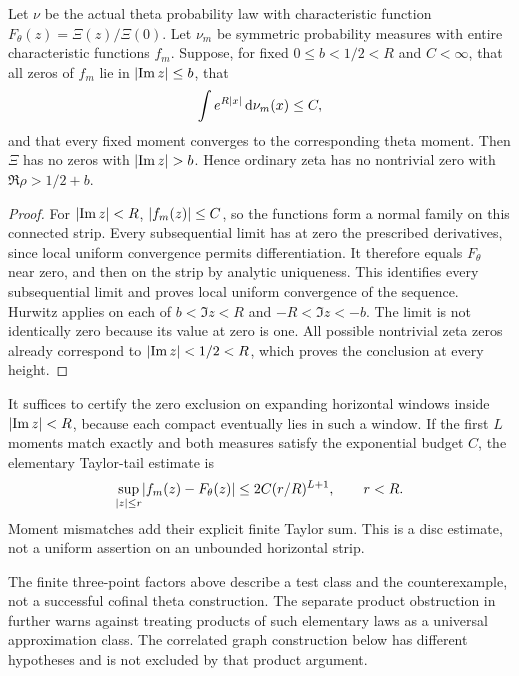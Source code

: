 \begin{theorem}\label{thm:strip-transfer}
Let $\nu$ be the actual theta probability law with characteristic function $F_\theta(z)=\Xi(z)/\Xi(0)$. Let $\nu_m$ be symmetric probability measures with entire characteristic functions $f_m$. Suppose, for fixed $0\le b<1/2<R$ and $C<\infty$, that all zeros of $f_m$ lie in $\lvert\operatorname{Im} z\rvert\le b$, that
\begin{equation}\label{eq:one-exp-budget}
 \int e^{R\lvert x\rvert}\,\mathrm d\nu_m(x)\le C,
\end{equation}
and that every fixed moment converges to the corresponding theta moment. Then $\Xi$ has no zeros with $\lvert\operatorname{Im} z\rvert>b$. Hence ordinary zeta has no nontrivial zero with $\Re\rho>1/2+b$.
\end{theorem}
\begin{proof}
For $\lvert\operatorname{Im} z\rvert<R$, $\lvert f_m(z)\rvert\le C$, so the functions form a normal family on this connected strip. Every subsequential limit has at zero the prescribed derivatives, since local uniform convergence permits differentiation. It therefore equals $F_\theta$ near zero, and then on the strip by analytic uniqueness. This identifies every subsequential limit and proves local uniform convergence of the sequence. Hurwitz applies on each of $b<\Im z<R$ and $-R<\Im z<-b$. The limit is not identically zero because its value at zero is one. All possible nontrivial zeta zeros already correspond to $\lvert\operatorname{Im} z\rvert<1/2<R$, which proves the conclusion at every height.
\end{proof}

It suffices to certify the zero exclusion on expanding horizontal windows inside $\lvert\operatorname{Im} z\rvert<R$, because each compact eventually lies in such a window. If the first $L$ moments match exactly and both measures satisfy the exponential budget $C$, the elementary Taylor-tail estimate is
\[
 \sup_{\lvert z\rvert\le r}\lvert f_m(z)-F_\theta(z)\rvert
 \le2C(r/R)^{L+1},\qquad r<R.
\]
Moment mismatches add their explicit finite Taylor sum. This is a disc estimate, not a uniform assertion on an unbounded horizontal strip.

The finite three-point factors above describe a test class and the counterexample, not a successful cofinal theta construction. The separate product obstruction in \cite[strip proof]{R1001} further warns against treating products of such elementary laws as a universal approximation class. The correlated graph construction below has different hypotheses and is not excluded by that product argument.

